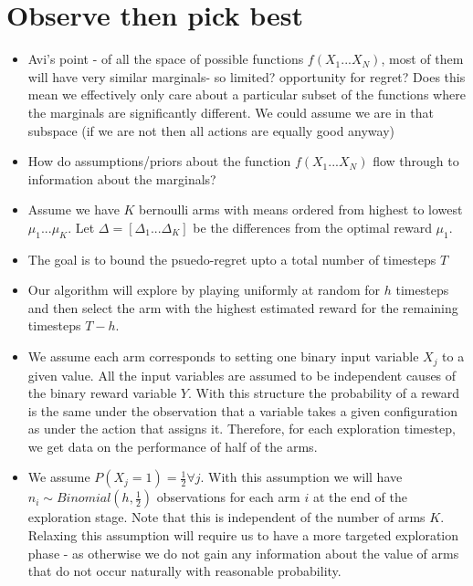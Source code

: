 \documentclass{article}
\theoremstyle{plain}
\theoremstyle{definition}
\begin{document}
\def\ci{\perp\!\!\!\perp}

\section*{Observe then pick best}
\begin{itemize}
\item Avi's point - of all the space of possible functions $f(X_1...X_N)$, most of them will have very similar marginals- so limited? opportunity for regret? Does this mean we effectively only care about a particular subset of the functions where the marginals are significantly different. We could assume we are in that subspace (if we are not then all actions are equally good anyway)

\item How do assumptions/priors about the function $f(X_1...X_N)$ flow through to information about the marginals?%

\item Assume we have $K$ bernoulli arms with means ordered from highest to lowest $\mu_1 ... \mu_K$. Let $\Delta = [\Delta_1...\Delta_K]$ be the differences from the optimal reward $\mu_1$. 

\item The goal is to bound the psuedo-regret upto a total number of timesteps $T$

\item Our algorithm will explore by playing uniformly at random for $h$ timesteps and then select the arm with the highest estimated reward for the remaining timesteps $T-h$.

\item We assume each arm corresponds to setting one binary input variable $X_j$ to a given value. All the input variables are assumed to be independent causes of the binary reward variable $Y$. With this structure the probability of a reward is the same under the observation that a variable takes a given configuration as under the action that assigns it. Therefore, for each exploration timestep, we get data on the performance of half of the arms. 

\item We assume $P(X_j = 1) = \frac{1}{2} \forall j$. With this assumption we will have $n_i \sim Binomial(h,\frac{1}{2})$ observations for each arm $i$ at the end of the exploration stage. Note that this is independent of the number of arms $K$. Relaxing this assumption will require us to have a more targeted exploration phase - as otherwise we do not gain any information about the value of arms that do not occur naturally with reasonable probability. 
\end{itemize}
\end{document}
